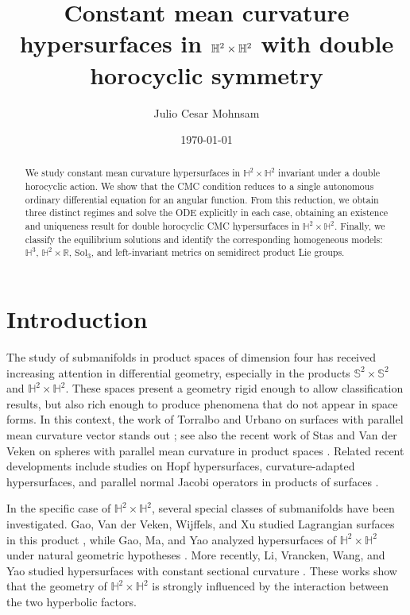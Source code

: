 \documentclass[11pt,a4paper]{amsart}
\title[Horocyclic CMC  hypersurfaces in $\Hyp^2\times\Hyp^2$]%
{Constant mean curvature hypersurfaces in $\Hyp^2\times\Hyp^2$ with double horocyclic symmetry}
\author{Julio Cesar Mohnsam}
\date{\today}
\theoremstyle{plain}
\theoremstyle{remark}
\newcommand{\R}{\mathbb{R}}
\newcommand{\Hyp}{\mathbb{H}}
\begin{document}
\begin{abstract}
We study constant mean curvature hypersurfaces in $\Hyp^2\times\Hyp^2$
invariant under a double horocyclic action. We show that the CMC condition
reduces to a single autonomous ordinary differential equation for an angular
function. From this reduction, we obtain three distinct regimes and solve the 
ODE explicitly in each case, obtaining an
existence and uniqueness result for double horocyclic CMC hypersurfaces in $\Hyp^2\times\Hyp^2$.
Finally, we classify the equilibrium solutions and identify the corresponding
homogeneous models: $\Hyp^3$, $\Hyp^2\times\R$, $\mathrm{Sol}_3$, and
left-invariant metrics on semidirect product Lie groups.
\end{abstract}



\maketitle


\section{Introduction}
\label{sec:introducao}

The study of submanifolds in product spaces of dimension four has received increasing attention in differential geometry, especially in the products $\mathbb S^2\times\mathbb S^2$ and $\Hyp^2\times\Hyp^2$. These spaces present a geometry rigid enough to allow classification results, but also rich enough to produce phenomena that do not appear in space forms. In this context, the work of Torralbo and Urbano on surfaces with parallel mean curvature vector stands out \cite{TorralboUrbano2012}; see also the recent work of Stas and Van der Veken on spheres with parallel mean curvature in product spaces \cite{StasVanDerVeken2025}. Related recent developments include studies on Hopf hypersurfaces, curvature-adapted hypersurfaces, and parallel normal Jacobi operators in products of surfaces \cite{HuLuYaoZhang2023,HuLuYaoZhangIJM2024,HuLu2024}.

In the specific case of $\Hyp^2\times\Hyp^2$, several special classes of
submanifolds have been investigated. Gao, Van der Veken, Wijffels, and Xu
studied Lagrangian surfaces in this product \cite{GaoVdVWijffelsXu2021},
while Gao, Ma, and Yao analyzed hypersurfaces of
$\Hyp^2\times\Hyp^2$ under natural geometric hypotheses
\cite{GaoMaYao2022}. More recently, Li, Vrancken, Wang, and Yao studied
hypersurfaces with constant sectional curvature
\cite{LiVranckenWangYao2026}. These works show that the geometry of
$\Hyp^2\times\Hyp^2$ is strongly influenced by the interaction between the
two hyperbolic factors.
\end{document}
